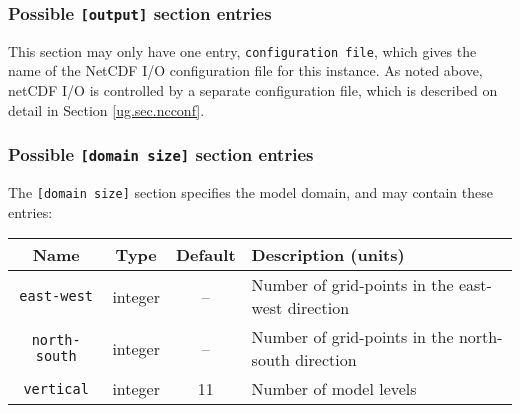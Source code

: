 \subsubsection{Possible \texttt{[output]} section entries}
%
This section may only have one entry, \texttt{configuration file}, which
gives the name of the NetCDF I/O configuration file for this instance. As
noted above, netCDF I/O is controlled by a separate configuration file, which
is described on detail in Section \ref{ug.sec.ncconf}. 
%
\subsubsection{Possible \texttt{[domain size]} section entries}
%
The \texttt{[domain size]} section specifies the model domain,
and may contain these entries:
%
\begin{center}
\begin{tabular}{|c|c|c|l|}
\hline
Name & Type & Default & Description (units) \\
\hline
\hline
\texttt{east-west} & integer & -- & Number of grid-points in the east-west
direction \\
\hline
\texttt{north-south} & integer & -- & Number of grid-points in the north-south
direction \\
\hline
\texttt{vertical} & integer & 11 & Number of model levels \\
\hline
\end{tabular}
\end{center}
%
